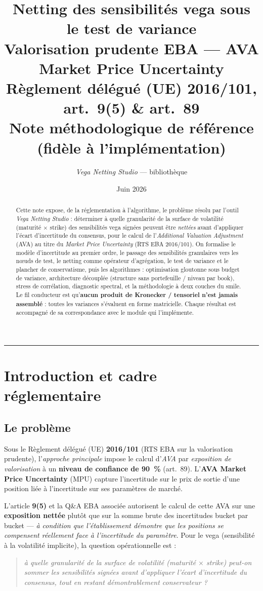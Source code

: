 \documentclass[11pt,a4paper]{article}
\title{\textbf{Netting des sensibilités vega sous le test de variance}\\[4pt]
\large Valorisation prudente EBA --- AVA Market Price Uncertainty\\
Règlement délégué (UE) 2016/101, art.~9(5) \& art.~89\\[6pt]
\normalsize Note méthodologique de référence (fidèle à l'implémentation)}
\author{\textit{Vega Netting Studio} --- bibliothèque \code{ebanetting}}
\date{Juin 2026}
\theoremstyle{plain}
\theoremstyle{definition}
\theoremstyle{remark}
\begin{document}
\maketitle
\begin{abstract}
\noindent
Cette note expose, de la réglementation à l'algorithme, le problème résolu par
l'outil \emph{Vega Netting Studio} : déterminer à quelle granularité de la surface
de volatilité (maturité $\times$ strike) des sensibilités vega signées peuvent être
\emph{nettées} avant d'appliquer l'écart d'incertitude du consensus, pour le calcul
de l'\emph{Additional Valuation Adjustment} (AVA) au titre du \emph{Market Price
Uncertainty} (RTS EBA 2016/101). On formalise le modèle d'incertitude au premier
ordre, le passage des sensibilités granulaires vers les nœuds de test, le netting
comme opérateur d'agrégation, le test de variance et le plancher de conservatisme,
puis les algorithmes : optimisation gloutonne sous budget de variance, architecture
découplée (structure sans portefeuille / niveau par book), stress de corrélation,
diagnostic spectral, et la méthodologie à deux couches du smile. Le fil conducteur
est qu'\textbf{aucun produit de Kronecker / tensoriel n'est jamais assemblé} : toutes
les variances s'évaluent en forme matricielle. Chaque résultat est accompagné de sa
correspondance avec le module qui l'implémente.
\end{abstract}

\tableofcontents
\bigskip\hrule\bigskip

\section{Introduction et cadre réglementaire}

\subsection{Le problème}
Sous le Règlement délégué (UE) \textbf{2016/101} (RTS EBA sur la valorisation
prudente), l'\emph{approche principale} impose le calcul d'\emph{AVA} par
\emph{exposition de valorisation} à un \textbf{niveau de confiance de 90~\%}
(art.~89). L'\textbf{AVA Market Price Uncertainty} (MPU) capture l'incertitude sur
le prix de sortie d'une position liée à l'incertitude sur ses paramètres de marché.

L'article \textbf{9(5)} et la Q\&A EBA associée autorisent le calcul de cette AVA
sur une \textbf{exposition nettée} plutôt que sur la somme brute des incertitudes
bucket par bucket --- \emph{à condition que l'établissement démontre que les positions
se compensent réellement face à l'incertitude du paramètre}. Pour le vega
(sensibilité à la volatilité implicite), la question opérationnelle est :
\begin{quote}\itshape
à quelle granularité de la surface de volatilité (maturité $\times$ strike) peut-on
sommer les sensibilités signées avant d'appliquer l'écart d'incertitude du consensus,
tout en restant démontrablement conservateur ?
\end{quote}
\end{document}

